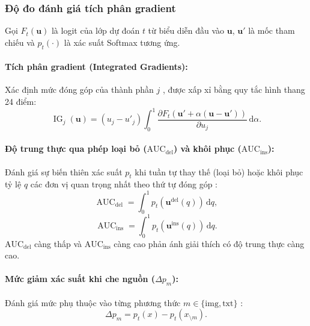 \subsubsection{Độ đo đánh giá tích phân gradient}

Gọi $F_t(\boldsymbol{u})$ là logit của lớp dự đoán $t$ từ biểu diễn đầu vào $\boldsymbol{u}$, $\boldsymbol{u}'$ là mốc tham chiếu và $p_t(\cdot)$ là xác suất Softmax tương ứng.

\paragraph{Tích phân gradient (Integrated Gradients):} Xác định mức đóng góp của thành phần $j$ \cite{Sundararajan2017IntegratedGradients}, được xấp xỉ bằng quy tắc hình thang 24 điểm:
\begin{equation}
\operatorname{IG}_j(\boldsymbol{u})=(u_j-u'_j)
\int_{0}^{1}\frac{\partial F_t\!\left(
\boldsymbol{u}'+\alpha(\boldsymbol{u}-\boldsymbol{u}')\right)}
{\partial u_j}\,\mathrm{d}\alpha.
\label{eq:ch4_integrated_gradients}
\end{equation}

\paragraph{Độ trung thực qua phép loại bỏ ($\mathrm{AUC}_{\mathrm{del}}$) và khôi phục ($\mathrm{AUC}_{\mathrm{ins}}$):} Đánh giá sự biến thiên xác suất $p_t$ khi tuần tự thay thế (loại bỏ) hoặc khôi phục tỷ lệ $q$ các đơn vị quan trọng nhất theo thứ tự đóng góp \cite{Petsiuk2018RISE}:
\begin{equation}
\operatorname{AUC}_{\mathrm{del}}=
\int_{0}^{1}p_t\!\left(\boldsymbol{u}^{\mathrm{del}}(q)\right)\,\mathrm{d}q,
\label{eq:ch4_deletion_auc}
\end{equation}
\begin{equation}
\operatorname{AUC}_{\mathrm{ins}}=
\int_{0}^{1}p_t\!\left(\boldsymbol{u}^{\mathrm{ins}}(q)\right)\,\mathrm{d}q.
\label{eq:ch4_insertion_auc}
\end{equation}
$\mathrm{AUC}_{\mathrm{del}}$ càng thấp và $\mathrm{AUC}_{\mathrm{ins}}$ càng cao phản ánh giải thích có độ trung thực càng cao.

\paragraph{Mức giảm xác suất khi che nguồn ($\Delta p_m$):} Đánh giá mức phụ thuộc vào từng phương thức $m \in \{\mathrm{img}, \mathrm{txt}\}$ \cite{DeYoung2020ERASER}:
\begin{equation}
\Delta p_m=p_t(x)-p_t(x_{\setminus m}).
\label{eq:ch4_source_probability_drop}
\end{equation}


